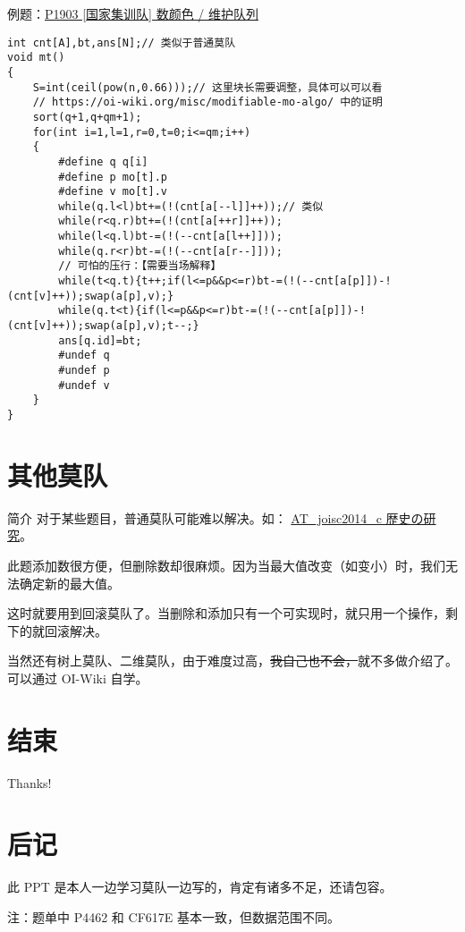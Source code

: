 \documentclass[table]{beamer}
\begin{document}
\begin{frame}[fragile]{例题：{\color{blue}\href{https://www.luogu.com.cn/problem/P1903}{P1903 [国家集训队] 数颜色 / 维护队列}}}
\tiny
\begin{verbatim}
int cnt[A],bt,ans[N];// 类似于普通莫队
void mt()
{
    S=int(ceil(pow(n,0.66)));// 这里块长需要调整，具体可以可以看
    // https://oi-wiki.org/misc/modifiable-mo-algo/ 中的证明
    sort(q+1,q+qm+1);
    for(int i=1,l=1,r=0,t=0;i<=qm;i++)
    {
        #define q q[i]
        #define p mo[t].p
        #define v mo[t].v
        while(q.l<l)bt+=(!(cnt[a[--l]]++));// 类似
        while(r<q.r)bt+=(!(cnt[a[++r]]++));
        while(l<q.l)bt-=(!(--cnt[a[l++]]));
        while(q.r<r)bt-=(!(--cnt[a[r--]]));
        // 可怕的压行：【需要当场解释】
        while(t<q.t){t++;if(l<=p&&p<=r)bt-=(!(--cnt[a[p]])-!(cnt[v]++));swap(a[p],v);}
        while(q.t<t){if(l<=p&&p<=r)bt-=(!(--cnt[a[p]])-!(cnt[v]++));swap(a[p],v);t--;}
        ans[q.id]=bt;
        #undef q
        #undef p
        #undef v
    }
}
\end{verbatim}
\end{frame}

\section{其他莫队}

\begin{frame}{简介}
	对于某些题目，普通莫队可能难以解决。如：
	{\color{blue}\href{https://www.luogu.com.cn/problem/AT_joisc2014_c}{AT\_joisc2014\_c 歴史の研究}}。

	此题添加数很方便，但删除数却很麻烦。因为当最大值改变（如变小）时，我们无法确定新的最大值。

	这时就要用到回滚莫队了。当删除和添加只有一个可实现时，就只用一个操作，剩下的就回滚解决。
	\pause

	当然还有树上莫队、二维莫队，由于难度过高，\sout{我自己也不会，}就不多做介绍了。可以通过 OI-Wiki 自学。
\end{frame}

\section{结束}

\begin{frame}
	\begin{center}
		\fontsize{48pt}{0pt}\selectfont
		Thanks!
	\end{center}
\end{frame}

\section{后记}
\begin{frame}
	此 PPT 是本人一边学习莫队一边写的，肯定有诸多不足，还请包容。
	
	注：题单中 P4462 和 CF617E 基本一致，但数据范围不同。
\end{frame}
\end{document}

